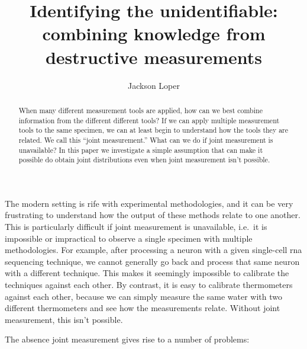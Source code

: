 



\DeclareMathOperator*{\tr}{tr}

\newcommand{\UN}[1]{\ensuremath{\left|#1\right|_\infty}}
\newcommand{\EN}[1]{\ensuremath{\left|#1\right|}}
\newcommand{\kldiv}[2]{\ensuremath{D\left(#1||#2\right)}}

\usepackage{cancel}


\title{Identifying the unidentifiable: combining knowledge from destructive measurements}
\author{Jackson Loper}

\usepackage{amsthm}
\newtheorem*{thm}{Theorem}
\newtheorem{lem}{Lemma}
\newtheorem{conj}{Conjecture}


\maketitle

\begin{abstract}
When many different measurement tools are applied, how can we best combine information from the different different tools?  If we can apply multiple measurement tools to the same specimen, we can at least begin to understand how the tools they are related.  We call this ``joint measurement.''  What can we do if joint measurement is unavailable?  In this paper we investigate a simple assumption that can make it possible do obtain joint distributions even when joint measurement isn't possible.
\end{abstract}

The modern setting is rife with experimental methodologies, and it can be very frustrating to understand how the output of these methods relate to one another.  This is particularly difficult if joint measurement is unavailable, i.e.\ it is impossible or impractical to observe a single specimen with multiple methodologies.  For example, after processing a neuron with a given single-cell rna sequencing technique, we cannot generally go back and process that same neuron with a different technique.   This makes it seemingly impossible to calibrate the techniques against each other.  By contrast, it is easy to calibrate thermometers against each other, because we can simply measure the same water with two different thermometers and see how the measurements relate.  Without joint measurement, this isn't possible.

The absence joint measurement gives rise to a number of problems:


